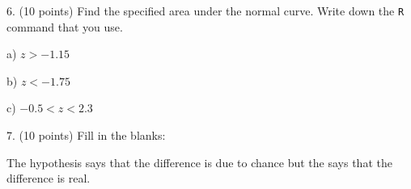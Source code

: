 \documentclass[10pt]{article}
\begin{document}
\vfill
\eject


6. (10 points) Find the specified area under the normal curve.  Write down the \texttt{R} command that you use.

\hspace{10pt} a) $z>-1.15$ 
\bigskip
\bigskip\bigskip\bigskip

\hspace{10pt} b) $z<-1.75$
\bigskip
\bigskip\bigskip\bigskip

\hspace{10pt} c) $-0.5 < z < 2.3$
\bigskip\bigskip\bigskip\bigskip


7. (10 points)  
Fill in the blanks: 

The \underline{\hspace{60pt}} hypothesis says that the difference is due to chance
but the \underline{\hspace{60pt}} says that the difference is real.  
\vfill
\end{document}
